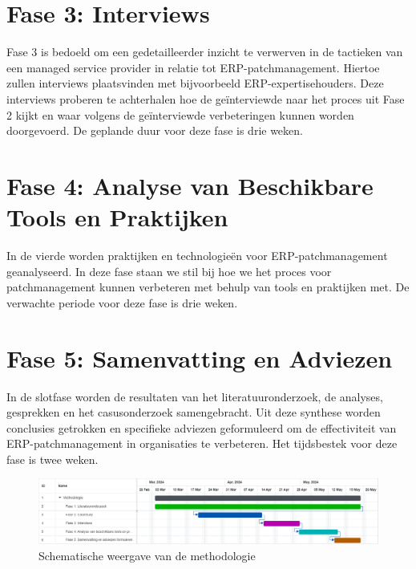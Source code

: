 \section{Fase 3: Interviews}
Fase 3 is bedoeld om een gedetailleerder inzicht te verwerven in de tactieken van een managed service provider in relatie tot ERP-patchmanagement. Hiertoe zullen interviews plaatsvinden met bijvoorbeeld ERP-expertisehouders. Deze 
interviews proberen te achterhalen hoe de geïnterviewde naar het proces uit Fase 2 kijkt en waar volgens de geïnterviewde verbeteringen kunnen worden doorgevoerd. De geplande duur voor deze fase is drie weken.
\section{Fase 4: Analyse van Beschikbare Tools en Praktijken}
In de vierde worden praktijken en technologieën voor ERP-patchmanagement geanalyseerd. In deze fase staan we stil bij hoe we het proces voor patchmanagement kunnen verbeteren met behulp van tools en praktijken met. De verwachte periode voor deze fase is drie weken.
\section{Fase 5: Samenvatting en Adviezen}
In de slotfase worden de resultaten van het literatuuronderzoek, de analyses, gesprekken en het casusonderzoek samengebracht. Uit deze synthese worden conclusies getrokken en specifieke adviezen geformuleerd om de effectiviteit 
van ERP-patchmanagement in organisaties te verbeteren. Het tijdsbestek voor deze fase is twee weken. \\

\begin{figure}[h]
    \centering
    \includegraphics[width=\textwidth]{methodologie2.png}
    \caption{Schematische weergave van de methodologie}
     \label{fig:methodologie2}
\end{figure}
\newpage
